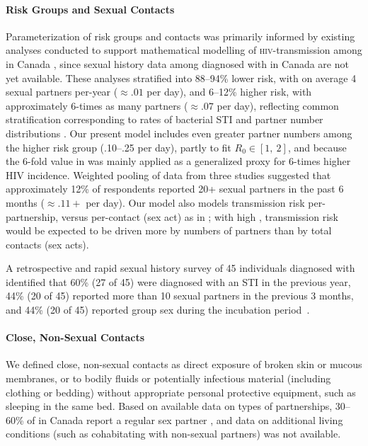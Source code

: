 \paragraph{Risk Groups and Sexual Contacts}
Parameterization of risk groups and contacts was primarily informed by existing analyses conducted
to support mathematical modelling of \textsc{hiv}-transmission among \GBMSM in Canada
\cite[n.b. Appendix~3.2]{Wang2021},
since sexual history data among \GBMSM diagnosed with \MPXV in Canada are not yet available.
These analyses stratified \GBMSM into
88--94\% lower risk, with on average 4 sexual partners per-year ($\approx .01$ per day), and
6--12\% higher risk, with approximately 6-times as many partners ($\approx .07$ per day),
reflecting common stratification corresponding to
rates of bacterial STI and partner number distributions \cite{Hart2021,Brogan2019}.
Our present model includes even greater partner numbers among the higher risk group (.10--.25 per day),
partly to fit \MPXV $R_0 \in [1,~2]$, and because
the 6-fold value in \cite{Wang2021} was mainly applied as a generalized proxy for
6-times higher HIV incidence.
Weighted pooling of data from three studies \cite{MaleCall2013,Lachowsky2016,Wilton2016}
suggested that approximately 12\% of respondents
reported 20+ sexual partners in the past 6 months ($\approx .11+$ per day).
Our \MPXV model also models transmission risk per-partnership,
versus per-contact (sex act) as in \cite{Wang2021};
with high \SAR, \MPXV transmission risk would be expected to be
driven more by numbers of partners than by total contacts (sex acts).
\par
A retrospective and rapid sexual history survey of
45 individuals diagnosed with \MPXV identified that
60\% (27 of 45) were diagnosed with an STI in the previous year,
44\% (20 of 45) reported more than 10 sexual partners in the previous 3 months, and
44\% (20 of 45) reported group sex during the incubation period~\cite{UKHSA2022}.
\paragraph{Close, Non-Sexual Contacts}
We defined close, non-sexual contacts as
direct exposure of broken skin or mucous membranes,
or to bodily fluids or potentially infectious material (including clothing or bedding)
without appropriate personal protective equipment,
such as sleeping in the same bed.
Based on available data on types of partnerships,
30--60\% of \GBMSM in Canada report a regular sex partner \cite{Milwid2022},
and data on additional living conditions (such as cohabitating with non-sexual partners) was not available.
